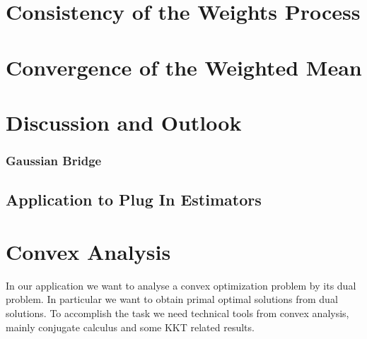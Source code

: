 \documentclass[11pt, a4paper, BCOR=10mm, DIV=11]{scrbook}
\theoremstyle{definition}
\theoremstyle{plain}
\begin{document}
\chapter{Consistency of the Weights Process}
  

\chapter{Convergence of the Weighted Mean}
  
\chapter{Discussion and Outlook}
  
%  
%  
  \subsection*{Gaussian Bridge}
  
  
  \section{Application to Plug In Estimators}
  

\chapter{Convex Analysis}
In our application we want to analyse a convex optimization problem by its dual problem.
In particular we want to obtain primal optimal solutions from dual solutions.
To accomplish the task we need technical tools from convex analysis, 
mainly conjugate calculus and some KKT related results.
\end{document}
